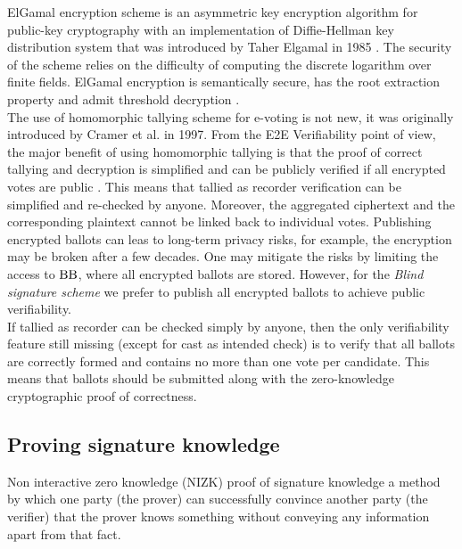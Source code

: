 ElGamal encryption scheme  is an asymmetric key encryption algorithm for public-key cryptography with an implementation of Diffie-Hellman key distribution system  that was introduced  by Taher Elgamal in 1985 \cite{Elgamal1985}. The security of the scheme relies on the difficulty of computing the discrete logarithm over finite fields.  ElGamal encryption is semantically secure, has the root extraction property and admit threshold decryption  \cite{Groth2010}. \\

The use of homomorphic tallying scheme for e-voting is not new, it was originally introduced by Cramer et al. \cite{Cramer1997}  in 1997. From the E2E Verifiability point of view, the major benefit of using homomorphic tallying is that the proof of correct tallying and decryption is simplified and can be publicly verified if all encrypted votes are public \cite{Parsovs2016}. This means that tallied as recorder verification can be simplified and re-checked by anyone.  Moreover, the aggregated ciphertext and the corresponding plaintext cannot be linked back to individual votes. Publishing encrypted ballots can leas to long-term privacy risks, for example, the encryption may be broken after a few decades. One may mitigate the risks by limiting the access to $\operatorname{BB}$, where all encrypted ballots are stored. However, for the \textit{Blind signature scheme} we prefer to publish all encrypted ballots to achieve  public verifiability.\\

If tallied as recorder can be checked simply by anyone, then the only  verifiability feature still missing (except for cast as intended check) is to verify that all ballots are correctly formed and contains no more than one vote per candidate. This means that ballots should be submitted along with the zero-knowledge cryptographic proof of correctness. 
\subsection{Proving signature knowledge}
Non interactive zero knowledge (NIZK) proof  of signature knowledge a method by which one party (the prover) can successfully convince another party (the verifier) that the prover knows something without conveying any information apart from that fact.\\

